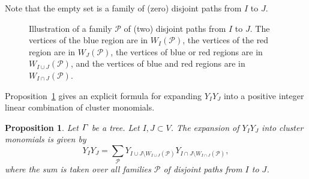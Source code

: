 \documentclass[11pt]{article}
\newtheorem{prop}[theo]{Proposition}
\theoremstyle{definition}
\numberwithin{equation}{section}
\newcommand{\vertices}{V}
\begin{document}
Note that the empty set is a family of (zero) disjoint paths from \(I\) to \(J\).

\begin{figure}[htbp]
    \centering
    \caption{Illustration of a family \(\mathcal{P}\) of (two) disjoint paths from \(I\) to \(J\).
    The vertices of the blue region are in \(W_I(\mathcal{P})\),
    the vertices of the red region are in \(W_J(\mathcal{P})\),
    the vertices of blue or red regions are in \(W_{I \cup J}(\mathcal{P})\),
    and the vertices of blue and red regions are in \(W_{I \cap J}(\mathcal{P})\).}
    \label{fig:disjointpaths}
\end{figure}

Proposition~\ref{proposition:expansionfortrees} gives an explicit formula for expanding \(Y_IY_J\) into a positive integer linear combination of cluster monomials.

\begin{prop} \label{proposition:expansionfortrees}
    Let \(\varGamma\) be a tree.
    Let \(I, J \subset \vertices\).
    The expansion of \(Y_IY_J\) into cluster monomials is given by
    \begin{equation*}
        Y_IY_J = \sum_{\mathcal{P}} Y_{I \cup J \setminus W_{I \cup J}(\mathcal{P})}Y_{I \cap J \setminus W_{I \cap J}(\mathcal{P})},
    \end{equation*} 
    where the sum is taken over all families \(\mathcal{P}\) of disjoint paths from \(I\) to \(J\).
\end{prop}
\end{document}
